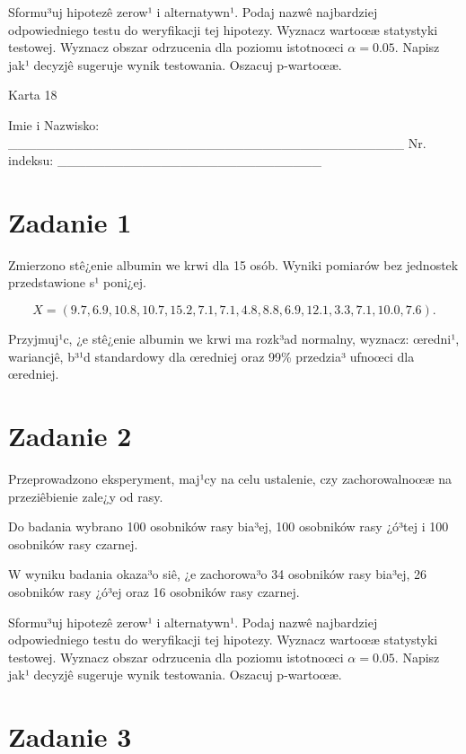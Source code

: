 \documentclass[a4paper,12pt]{article}
\begin{document}
     Sformu³uj hipotezê zerow¹ i alternatywn¹. 
     Podaj nazwê najbardziej odpowiedniego testu do weryfikacji tej hipotezy. 
     Wyznacz wartoœæ statystyki testowej. 
     Wyznacz obszar odrzucenia dla poziomu istotnoœci $\alpha=0.05$. 
     Napisz jak¹ decyzjê sugeruje wynik testowania. 
     Oszacuj p-wartoœæ. \vspace{1cm} 

  \clearpage  Karta  18  

 Imie i Nazwisko: \_\_\_\_\_\_\_\_\_\_\_\_\_\_\_\_\_\_\_\_\_\_\_\_\_\_\_\_\_\_\_\_\_\_\_\_\_\_\_\_\_\_ Nr. indeksu: \_\_\_\_\_\_\_\_\_\_\_\_\_\_\_\_\_\_\_\_\_\_\_\_\_\_\_\_ 
 \section*{Zadanie 1}
     
     Zmierzono stê¿enie albumin we krwi dla 15 osób. 
     Wyniki pomiarów bez jednostek przedstawione s¹ poni¿ej. 
     
     \noindent $$X=(  9.7,  6.9, 10.8, 10.7, 15.2,  7.1,  7.1,  4.8,  8.8,  6.9, 12.1,  3.3,  7.1, 10.0,  7.6 ).$$
     
     Przyjmuj¹c, ¿e stê¿enie albumin we krwi ma rozk³ad normalny, 
     wyznacz: œredni¹, wariancjê, b³¹d standardowy dla œredniej oraz 99\% przedzia³ ufnoœci dla œredniej. \vspace{1cm} 

  \section*{Zadanie 2}
     
  Przeprowadzono eksperyment, maj¹cy na celu ustalenie, czy zachorowalnoœæ na przeziêbienie zale¿y od rasy.
  
  Do badania wybrano 100 osobników rasy bia³ej, 100 osobników rasy ¿ó³tej i 100 osobników rasy czarnej. 
  
  W wyniku badania okaza³o siê, ¿e zachorowa³o 34 osobników rasy bia³ej, 26 osobników rasy ¿ó³ej oraz 16 osobników rasy czarnej. 
  
  Sformu³uj hipotezê zerow¹ i alternatywn¹. 
  Podaj nazwê najbardziej odpowiedniego testu do weryfikacji tej hipotezy. 
  Wyznacz wartoœæ statystyki testowej. 
  Wyznacz obszar odrzucenia dla poziomu istotnoœci $\alpha=0.05$. 
  Napisz jak¹ decyzjê sugeruje wynik testowania. Oszacuj p-wartoœæ. \vspace{1cm} 

  \section*{Zadanie 3}
     
\end{document}
